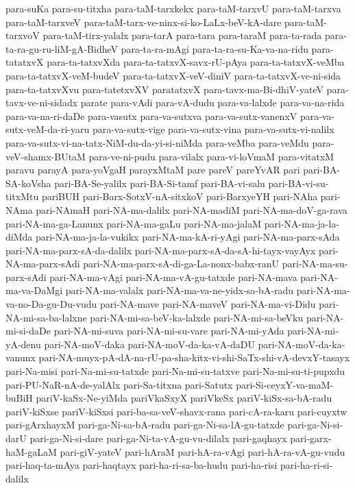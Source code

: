 {para-suKa
para-su-titxha
para-taM-tarxkekx
para-taM-tarxvU
para-taM-tarxva
para-taM-tarxveV
para-taM-tarx-ve-ninx-si-ko-LaLx-beV-kA-dare
para-taM-tarxvoV
para-taM-tirx-yalalx
para-tarA
para-tara
para-taraM
para-ta-rada
para-ta-ra-gu-ru-liM-gA-BidheV
para-ta-ra-mAgi
para-ta-ra-su-Ka-va-na-ridu
para-tatatxvX
para-ta-tatxvXda
para-ta-tatxvX-savx-rU-pAya
para-ta-tatxvX-veMba
para-ta-tatxvX-veM-budeV
para-ta-tatxvX-veV-diniV
para-ta-tatxvX-ve-ni-sida
para-ta-tatxvXvu
para-tatetxvXV
paratatxvX
para-tavx-ma-Bi-dhiV-yateV
para-tavx-ve-ni-sidadx
parate
para-vAdi
para-vA-dudu
para-va-lalxde
para-va-na-rida
para-va-na-ri-daDe
para-vasutx
para-va-sutxva
para-va-sutx-vanenxV
para-va-sutx-veM-da-ri-yaru
para-va-sutx-vige
para-va-sutx-vina
para-va-sutx-vi-nalilx
para-va-sutx-vi-na-tatx-NiM-du-da-yi-si-niMda
para-veMba
para-veMdu
para-veV-shamx-BUtaM
para-ve-ni-pudu
para-vilalx
para-vi-loVmaM
para-vitatxM
paravu
parayA
para-yoVgaH
parayxMtaM
pare
pareV
pareYvAR
pari
pari-BA-SA-koVsha
pari-BA-Se-yalilx
pari-BA-Si-tamf
pari-BA-vi-salu
pari-BA-vi-su-titxMtu
pariBUH
pari-Barx-SotxV-nA-sitxkoV
pari-BarxyeYH
pari-NAha
pari-NAma
pari-NAmaH
pari-NA-ma-dalilx
pari-NA-madiM
pari-NA-ma-doV-ga-rava
pari-NA-ma-ga-Lanunx
pari-NA-ma-gaLu
pari-NA-ma-jalaM
pari-NA-ma-ja-la-diMda
pari-NA-ma-ja-la-vukikx
pari-NA-ma-kA-ri-yAgi
pari-NA-ma-parx-sAda
pari-NA-ma-parx-sA-da-dalilx
pari-NA-ma-parx-sA-da-sA-hi-tayx-vayAyx
pari-NA-ma-parx-sAdi
pari-NA-ma-parx-sA-di-ga-La-nonx-babx-ranU
pari-NA-ma-su-parx-sAdi
pari-NA-ma-vAgi
pari-NA-ma-vA-gu-tatxde
pari-NA-mava
pari-NA-ma-va-DaMgi
pari-NA-ma-valalx
pari-NA-ma-va-ne-yidx-sa-bA-radu
pari-NA-ma-va-no-Da-gu-Du-vudu
pari-NA-mave
pari-NA-maveV
pari-NA-ma-vi-Didu
pari-NA-mi-sa-ba-lalxne
pari-NA-mi-sa-beV-ka-lalxde
pari-NA-mi-sa-beVku
pari-NA-mi-si-daDe
pari-NA-mi-suva
pari-NA-mi-su-vare
pari-NA-mi-yAda
pari-NA-mi-yA-denu
pari-NA-moV-daka
pari-NA-moV-da-ka-vA-daDU
pari-NA-moV-da-ka-vanunx
pari-NA-muyx-pA-dA-na-rU-pa-sha-kitx-vi-shi-SaTx-shi-vA-devxY-tasayx
pari-Na-misi
pari-Na-mi-su-tatxde
pari-Na-mi-su-tatxve
pari-Na-mi-su-ti-pupxdu
pari-PU-NaR-nA-de-yalAlx
pari-Sa-titxna
pari-Satutx
pari-Si-ceyxY-va-maM-buBiH
pariV-kaSx-Ne-yiMda
pariVkaSxyX
pariVkeSx
pariV-kiSx-sa-bA-radu
pariV-kiSxse
pariV-kiSxsi
pari-ba-sa-veV-shavx-rana
pari-cA-ra-karu
pari-cuyxtw
pari-gArxhayxM
pari-ga-Ni-sa-bA-radu
pari-ga-Ni-sa-lA-gu-tatxde
pari-ga-Ni-si-darU
pari-ga-Ni-si-dare
pari-ga-Ni-ta-vA-gu-vu-dilalx
pari-gaqhayx
pari-garx-haM-gaLaM
pari-giV-yateV
pari-hAraM
pari-hA-ra-vAgi
pari-hA-ra-vA-gu-vudu
pari-haq-ta-mAya
pari-haqtayx
pari-ha-ri-sa-ba-hudu
pari-ha-risi
pari-ha-ri-si-dalilx
}
